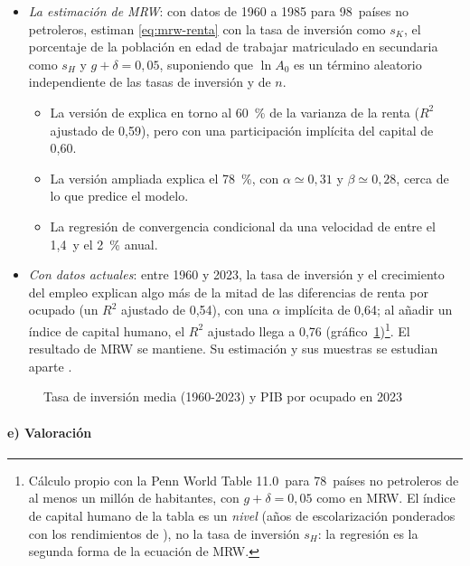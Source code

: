 \documentclass[11pt]{article}
\begin{document}
\begin{itemize}
\item \emph{La estimación de MRW}: con datos de 1960 a 1985 para 98~países no petroleros, estiman \eqref{eq:mrw-renta} con la tasa de inversión como $s_K$, el porcentaje de la población en edad de trabajar matriculado en secundaria como $s_H$ y $g+\delta=0{,}05$, suponiendo que $\ln A_0$ es un término aleatorio independiente de las tasas de inversión y de $n$.
  \begin{itemize}
  \item La versión de  explica en torno al 60~\% de la varianza de la renta ($R^2$ ajustado de 0,59), pero con una participación implícita del capital de 0,60.
  \item La versión ampliada explica el 78~\%, con $\alpha\simeq0{,}31$ y $\beta\simeq0{,}28$, cerca de lo que predice el modelo\nocite{MankiwRomerWeil1992}.
  \item La regresión de convergencia condicional da una velocidad de entre el 1,4~y el 2~\% anual\nocite{MankiwRomerWeil1992}.
  \end{itemize}
\item \emph{Con datos actuales}: entre 1960 y 2023, la tasa de inversión y el crecimiento del empleo explican algo más de la mitad de las diferencias de renta por ocupado (un $R^2$ ajustado de 0,54), con una $\alpha$ implícita de 0,64; al añadir un índice de capital humano, el $R^2$ ajustado llega a 0,76 (gráfico~\ref{fig:inversion-renta})\nocite{GGDC2025PWT}\footnote{Cálculo propio con la Penn World Table 11.0~para 78~países no petroleros de al menos un millón de habitantes, con $g+\delta=0{,}05$ como en MRW. El índice de capital humano de la tabla es un \emph{nivel} (años de escolarización ponderados con los rendimientos de ), no la tasa de inversión $s_H$: la regresión es la segunda forma de la ecuación de MRW.}. El resultado de MRW se mantiene. Su estimación y sus muestras se estudian aparte .
\end{itemize}

\begin{figure}[H]
\centering
\caption{Tasa de inversión media (1960-2023) y PIB por ocupado en 2023}\label{fig:inversion-renta}
\end{figure}

\paragraph{e) Valoración}
\end{document}
